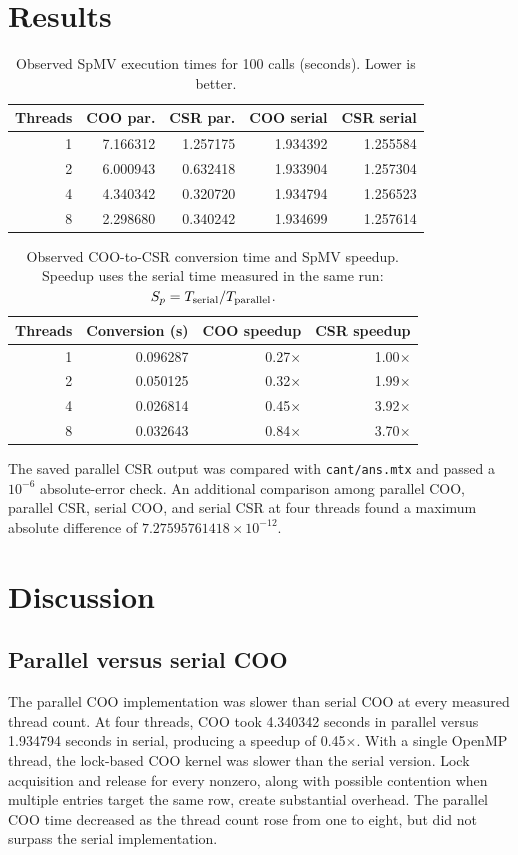 \documentclass[sigconf,nonacm]{acmart}
\begin{document}
\section{Results}
\begin{table}[H]
\caption{Observed SpMV execution times for 100 calls (seconds). Lower is better.}
\label{tab:times}
\centering
\small
\begin{tabular}{@{}r r r r r@{}}
\toprule
Threads & COO par. & CSR par. & COO serial & CSR serial \\
\midrule
1 & 7.166312 & 1.257175 & 1.934392 & 1.255584 \\
2 & 6.000943 & 0.632418 & 1.933904 & 1.257304 \\
4 & 4.340342 & 0.320720 & 1.934794 & 1.256523 \\
8 & 2.298680 & 0.340242 & 1.934699 & 1.257614 \\
\bottomrule
\end{tabular}
\end{table}

\begin{table}[t]
\caption{Observed COO-to-CSR conversion time and SpMV speedup. Speedup uses the serial time measured in the same run: $S_p=T_{\rm serial}/T_{\rm parallel}$.}
\label{tab:speedups}
\centering
\small
\begin{tabular}{@{}r r r r@{}}
\toprule
Threads & Conversion (s) & COO speedup & CSR speedup \\
\midrule
1 & 0.096287 & 0.27$\times$ & 1.00$\times$ \\
2 & 0.050125 & 0.32$\times$ & 1.99$\times$ \\
4 & 0.026814 & 0.45$\times$ & 3.92$\times$ \\
8 & 0.032643 & 0.84$\times$ & 3.70$\times$ \\
\bottomrule
\end{tabular}
\end{table}

The saved parallel CSR output was compared with \texttt{cant/ans.mtx} and passed a $10^{-6}$ absolute-error check. An additional comparison among parallel COO, parallel CSR, serial COO, and serial CSR at four threads found a maximum absolute difference of $7.27595761418\times10^{-12}$.

\section{Discussion}
\subsection{Parallel versus serial COO}
The parallel COO implementation was slower than serial COO at every measured thread count. At four threads, COO took 4.340342 seconds in parallel versus 1.934794 seconds in serial, producing a speedup of 0.45$\times$. With a single OpenMP thread, the lock-based COO kernel was slower than the serial version. Lock acquisition and release for every nonzero, along with possible contention when multiple entries target the same row, create substantial overhead. The parallel COO time decreased as the thread count rose from one to eight, but did not surpass the serial implementation.
\end{document}
